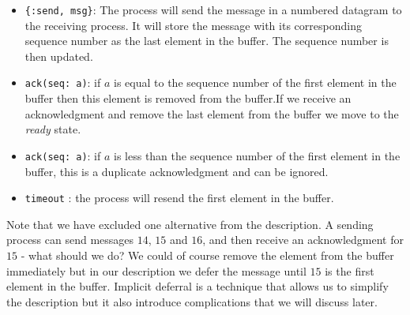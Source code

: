 \documentclass[a4paper,11pt]{article}
\begin{document}
\begin{itemize}
\item {\tt \{:send, msg\}}: The process will send the message in a
  numbered datagram to the receiving process. It will store the
  message with its corresponding sequence number as the last element in
  the buffer. The sequence number is then updated.

\item {\tt ack(seq: a)}: if $a$
  is equal to the sequence number of the first element in the buffer
  then this element is removed from the buffer.If we receive an
  acknowledgment and remove the last element from the buffer we move
  to the {\em ready} state.

\item {\tt ack(seq: a)}: if $a$ is less than the sequence number
  of the first element in the buffer, this is a duplicate
  acknowledgment and can be ignored.

\item {\tt timeout} : the process will resend the first element in the buffer.

\end{itemize}


Note that we have excluded one alternative from the description. A
sending process can send messages $14$, $15$ and $16$,
and then receive an acknowledgment for $15$
- what should we do? We could of course remove the element from the
buffer immediately but in our description we defer the message until
$15$ is the first element in the buffer. Implicit deferral is a technique
that allows us to simplify the description but it also introduce
complications that we will discuss later.
\end{document}
